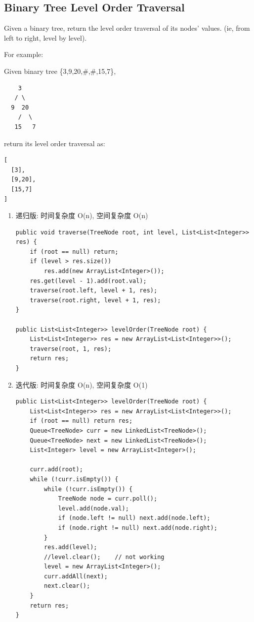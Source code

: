 \documentclass[12pt]{book}
\begin{document}
\subsection{Binary Tree Level Order Traversal}
\label{sec-4-2-4}
Given a binary tree, return the level order traversal of its nodes' values. (ie, from left to right, level by level).

For example:

Given binary tree \{3,9,20,\#,\#,15,7\},
\lstset{language=java,label= ,caption= ,numbers=none}
\begin{lstlisting}
    3
   / \
  9  20
    /  \
   15   7
\end{lstlisting}
return its level order traversal as:
\lstset{language=java,label= ,caption= ,numbers=none}
\begin{lstlisting}
[
  [3],
  [9,20],
  [15,7]
]
\end{lstlisting}

\begin{enumerate}
\item 递归版: 时间复杂度 O(n), 空间复杂度 O(n)
\label{sec-4-2-4-1}

\lstset{language=java,label= ,caption= ,numbers=none}
\begin{lstlisting}
public void traverse(TreeNode root, int level, List<List<Integer>> res) {
    if (root == null) return;
    if (level > res.size())
        res.add(new ArrayList<Integer>());
    res.get(level - 1).add(root.val);
    traverse(root.left, level + 1, res);
    traverse(root.right, level + 1, res);
}
        
public List<List<Integer>> levelOrder(TreeNode root) {
    List<List<Integer>> res = new ArrayList<List<Integer>>();
    traverse(root, 1, res);
    return res;
}
\end{lstlisting}

\item 迭代版: 时间复杂度 O(n), 空间复杂度 O(1)
\label{sec-4-2-4-2}

\lstset{language=java,label= ,caption= ,numbers=none}
\begin{lstlisting}
public List<List<Integer>> levelOrder(TreeNode root) {
    List<List<Integer>> res = new ArrayList<List<Integer>>();
    if (root == null) return res;
    Queue<TreeNode> curr = new LinkedList<TreeNode>();
    Queue<TreeNode> next = new LinkedList<TreeNode>();
    List<Integer> level = new ArrayList<Integer>();

    curr.add(root);
    while (!curr.isEmpty()) {
        while (!curr.isEmpty()) {
            TreeNode node = curr.poll();
            level.add(node.val);
            if (node.left != null) next.add(node.left);
            if (node.right != null) next.add(node.right);
        }
        res.add(level);
        //level.clear();    // not working
        level = new ArrayList<Integer>();
        curr.addAll(next);
        next.clear();
    }
    return res;
}
\end{lstlisting}
\end{enumerate}
\end{document}
